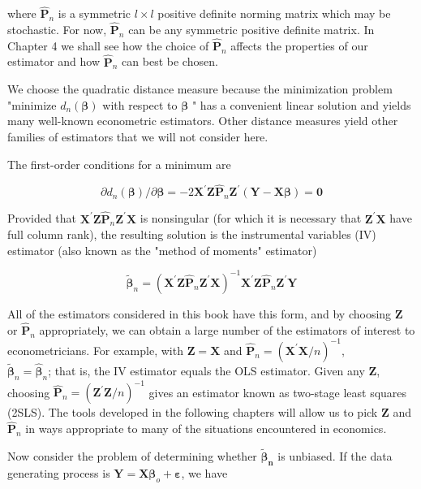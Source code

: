 \documentclass[10pt]{article}
\begin{document}
where $\hat{\mathbf{P}}_{n}$ is a symmetric $l \times l$ positive definite norming matrix which may be stochastic. For now, $\hat{\mathbf{P}}_{n}$ can be any symmetric positive definite matrix. In Chapter 4 we shall see how the choice of $\hat{\mathbf{P}}_{n}$ affects the properties of our estimator and how $\hat{\mathbf{P}}_{n}$ can best be chosen.

We choose the quadratic distance measure because the minimization problem "minimize $d_{n}(\boldsymbol{\beta})$ with respect to $\boldsymbol{\beta}$ " has a convenient linear solution and yields many well-known econometric estimators. Other distance measures yield other families of estimators that we will not consider here.

The first-order conditions for a minimum are

$$
\partial d_{n}(\boldsymbol{\beta}) / \partial \boldsymbol{\beta}=-2 \mathbf{X}^{\prime} \mathbf{Z} \hat{\mathbf{P}}_{n} \mathbf{Z}^{\prime}(\mathbf{Y}-\mathbf{X} \boldsymbol{\beta})=\mathbf{0}
$$

Provided that $\mathbf{X}^{\prime} \mathbf{Z} \hat{\mathbf{P}}_{n} \mathbf{Z}^{\prime} \mathbf{X}$ is nonsingular (for which it is necessary that $\mathbf{Z}^{\prime} \mathbf{X}$ have full column rank), the resulting solution is the instrumental variables (IV) estimator (also known as the "method of moments" estimator)

$$
\tilde{\boldsymbol{\beta}}_{n}=\left(\mathbf{X}^{\prime} \mathbf{Z} \hat{\mathbf{P}}_{n} \mathbf{Z}^{\prime} \mathbf{X}\right)^{-1} \mathbf{X}^{\prime} \mathbf{Z} \hat{\mathbf{P}}_{n} \mathbf{Z}^{\prime} \mathbf{Y}
$$

All of the estimators considered in this book have this form, and by choosing $\mathbf{Z}$ or $\hat{\mathbf{P}}_{n}$ appropriately, we can obtain a large number of the estimators of interest to econometricians. For example, with $\mathbf{Z}=\mathbf{X}$ and $\hat{\mathbf{P}}_{n}=\left(\mathbf{X}^{\prime} \mathbf{X} / n\right)^{-1}$,\\
$\tilde{\boldsymbol{\beta}}_{n}=\hat{\boldsymbol{\beta}}_{n}$; that is, the IV estimator equals the OLS estimator. Given any $\mathbf{Z}$, choosing $\hat{\mathbf{P}}_{n}=\left(\mathbf{Z}^{\prime} \mathbf{Z} / n\right)^{-1}$ gives an estimator known as two-stage least squares (2SLS). The tools developed in the following chapters will allow us to pick $\mathbf{Z}$ and $\hat{\mathbf{P}}_{n}$ in ways appropriate to many of the situations encountered in economics.

Now consider the problem of determining whether $\tilde{\boldsymbol{\beta}}_{\boldsymbol{n}}$ is unbiased. If the data generating process is $\mathbf{Y}=\mathbf{X} \boldsymbol{\beta}_{o}+\boldsymbol{\varepsilon}$, we have
\end{document}
